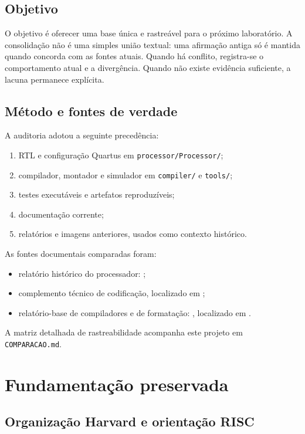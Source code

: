 \documentclass[
  12pt,
  oneside,
  a4paper,
  english,
  french,
  spanish,
  brazilian,
]{abntex2}
\begin{document}
\section{Objetivo}

O objetivo é oferecer uma base única e rastreável para o próximo laboratório. A consolidação não é uma simples união textual: uma afirmação antiga só é mantida quando concorda com as fontes atuais. Quando há conflito, registra-se o comportamento atual e a divergência. Quando não existe evidência suficiente, a lacuna permanece explícita.

\section{Método e fontes de verdade}

A auditoria adotou a seguinte precedência:
\begin{enumerate}
  \item RTL e configuração Quartus em \texttt{processor/Processor/};
  \item compilador, montador e simulador em \texttt{compiler/} e \texttt{tools/};
  \item testes executáveis e artefatos reproduzíveis;
  \item documentação corrente;
  \item relatórios e imagens anteriores, usados como contexto histórico.
\end{enumerate}

As fontes documentais comparadas foram:
\begin{itemize}
  \item relatório histórico do processador: ;
  \item complemento técnico de codificação, localizado em ;
  \item relatório-base de compiladores e de formatação: , localizado em .
\end{itemize}
A matriz detalhada de rastreabilidade acompanha este projeto em \texttt{COMPARACAO.md}.

\chapter{Fundamentação preservada}
\label{cap:fundamentacao}

\section{Organização Harvard e orientação RISC}
\end{document}
